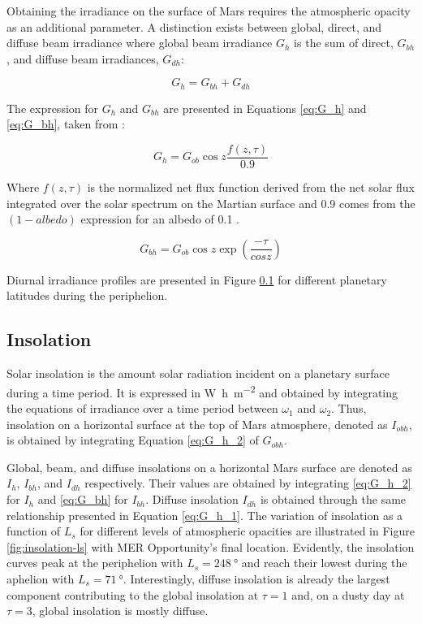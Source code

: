 
Obtaining the irradiance on the surface of Mars requires the atmospheric opacity as an additional parameter. A distinction exists between global, direct, and diffuse beam irradiance where global beam irradiance $G_{h}$ is the sum of direct, $G_{bh}$, and diffuse beam irradiances, $G_{dh}$:

\begin{equation}
  \label{eq:G_h_1}
  G_{h} = G_{bh} + G_{dh}
\end{equation}

The expression for $G_{h}$ and $G_{bh}$ are presented in Equations \ref{eq:G_h} and \ref{eq:G_bh}, taken from :

\begin{equation}
  \label{eq:G_h_2}
  G_{h} = G_{ob}\cos{z}\frac{f(z,\tau)}{0.9}
\end{equation}

Where $f(z,\tau)$ is the normalized net flux function derived from the net solar flux integrated over the solar spectrum on the Martian surface and 0.9 comes from the $(1-albedo)$ expression for an albedo of 0.1 .

\begin{equation}
  \label{eq:G_bh}
  G_{bh} = G_{ob}\cos{z}\exp(\frac{-\tau}{cos{z}})
\end{equation}

Diurnal irradiance profiles are presented in Figure \ref{} for different planetary latitudes during the periphelion.

\subsection{Insolation}

Solar insolation is the amount solar radiation incident on a planetary surface during a time period. It is expressed in \si{\watt\hour\per\meter\squared} and obtained by integrating the equations of irradiance over a time period between $\omega_1$ and $\omega_2$. Thus, insolation on a horizontal surface at the top of Mars atmosphere, denoted as $I_{obh}$, is obtained by integrating Equation \ref{eq:G_h_2} of $G_{obh}$.

Global, beam, and diffuse insolations on a horizontal Mars surface are denoted as $I_{h}$, $I_{bh}$, and $I_{dh}$ respectively. Their values are obtained by integrating \ref{eq:G_h_2} for $I_{h}$ and \ref{eq:G_bh} for $I_{bh}$. Diffuse insolation $I_{dh}$ is obtained through the same relationship presented in Equation \ref{eq:G_h_1}. The variation of insolation as a function of $L_{s}$ for different levels of atmospheric opacities are illustrated in Figure \ref{fig:insolation-ls} with MER Opportunity's final location. Evidently, the insolation curves peak at the periphelion with $L_{s} = \SI{248}{\degree}$ and reach their lowest during the aphelion with $L_{s} = \SI{71}{\degree}$. Interestingly, diffuse insolation is already the largest component contributing to the global insolation at $\tau = 1$ and, on a dusty day at $\tau = 3$, global insolation is mostly diffuse.

